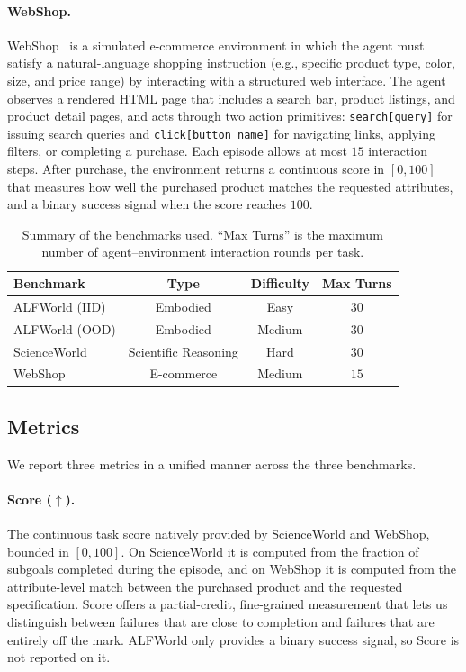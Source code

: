 \documentclass[11pt]{article}
\begin{document}
\paragraph{WebShop.}
WebShop~\citep{WebShop} is a simulated e-commerce environment in which the agent must satisfy a natural-language shopping instruction (e.g., specific product type, color, size, and price range) by interacting with a structured web interface. The agent observes a rendered HTML page that includes a search bar, product listings, and product detail pages, and acts through two action primitives: \texttt{search[query]} for issuing search queries and \texttt{click[button\_name]} for navigating links, applying filters, or completing a purchase. Each episode allows at most $15$ interaction steps. After purchase, the environment returns a continuous score in $[0, 100]$ that measures how well the purchased product matches the requested attributes, and a binary success signal when the score reaches $100$.

\begin{table}[t]
\centering
\scriptsize
\setlength{\tabcolsep}{2pt}
\caption{Summary of the benchmarks used. ``Max Turns'' is the maximum number of agent--environment interaction rounds per task.}
\label{tab:dataset_summary}
\begin{tabular}{lccc}
\toprule
\textbf{Benchmark}  & \textbf{Type} & \textbf{Difficulty} & \textbf{Max Turns} \\
\midrule
ALFWorld (IID)        & Embodied             & Easy   & $30$ \\
ALFWorld (OOD)        & Embodied             & Medium & $30$ \\
ScienceWorld          & Scientific Reasoning & Hard   & $30$ \\
WebShop               & E-commerce           & Medium & $15$ \\
\bottomrule
\end{tabular}
\end{table}

\subsection{Metrics}
\label{app:metrics}

We report three metrics in a unified manner across the three benchmarks.

\paragraph{Score ($\uparrow$).}
The continuous task score natively provided by ScienceWorld and WebShop, bounded in $[0, 100]$. On ScienceWorld it is computed from the fraction of subgoals completed during the episode, and on WebShop it is computed from the attribute-level match between the purchased product and the requested specification. Score offers a partial-credit, fine-grained measurement that lets us distinguish between failures that are close to completion and failures that are entirely off the mark. ALFWorld only provides a binary success signal, so Score is not reported on it.
\end{document}

